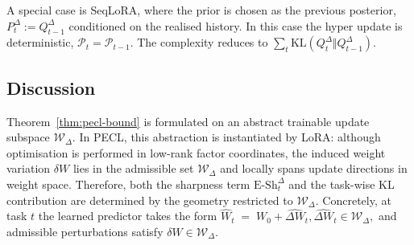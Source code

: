 \documentclass{article}
\theoremstyle{plain}
\theoremstyle{definition}
\theoremstyle{remark}
\begin{document}



A special case is SeqLoRA, where the prior is chosen as the previous posterior, $P_t^\Delta := Q_{t-1}^\Delta$ conditioned on the realised history. In this case the hyper update is deterministic, $\mathcal P_t = \mathcal P_{t-1}$. The complexity reduces to $\sum_t \mathrm{KL}(Q_t^\Delta\Vert Q_{t-1}^\Delta)$.

\subsection{Discussion}
\label{sec:geometry-lora-pecl}

Theorem~\ref{thm:pecl-bound} is formulated on an abstract trainable update subspace $\mathcal{W}_\Delta$. In PECL, this abstraction is instantiated by LoRA: although optimisation is performed in low-rank factor coordinates, the induced weight variation $\delta W$ lies in the admissible set $\mathcal{W}_\Delta$ and locally spans update directions in weight space. Therefore, both the sharpness term $\mathrm{E\text{-}Sh}_t^\Delta$ and the task-wise KL contribution are determined by the geometry restricted to $\mathcal{W}_\Delta$. Concretely, at task $t$ the learned predictor takes the form
$
\hat W_t \;=\; W_0+\hat{\Delta W}_t,
\hat{\Delta W}_t\in\mathcal{W}_\Delta,
$
and admissible perturbations satisfy $\delta W\in\mathcal{W}_\Delta$.
\end{document}
